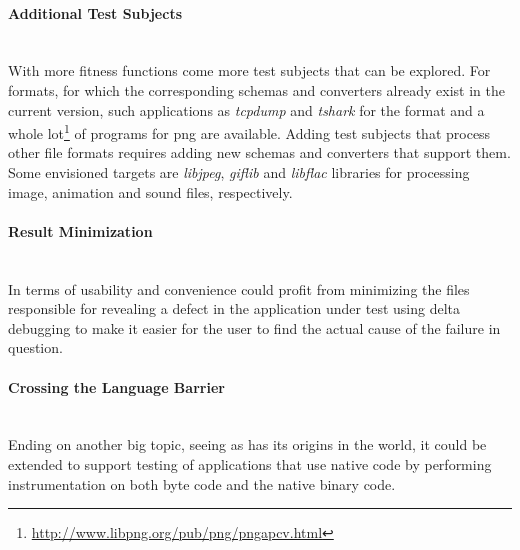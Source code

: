 \paragraph{Additional Test Subjects} ~\\
With more fitness functions come more test subjects that can be explored. For formats, for which the
corresponding schemas and converters already exist in the current version, such applications as \emph{tcpdump}
and \emph{tshark} for the \pcap format and a whole
lot\footnote{\url{http://www.libpng.org/pub/png/pngapcv.html}} of programs for {\small png} are available.
Adding test subjects that process other file formats requires adding new schemas and converters that
support them. Some envisioned targets are \emph{libjpeg}, \emph{giflib} and \emph{libflac} libraries for
processing image, animation and sound files, respectively.
\paragraph{Result Minimization} ~\\
In terms of usability and convenience \xmlmate could profit from minimizing the files responsible for
revealing a defect in the application under test using delta debugging\cite{zeller2002simplifying} to make it
easier for the user to find the actual cause of the failure in question.
\paragraph{Crossing the Language Barrier} ~\\
Ending on another big topic, seeing as \xmlmate has its origins in the \java world, it could be extended
to support testing of \java applications that use native code by performing instrumentation on both \java
byte code and the native binary code. 

{\color{white}{Thank you for reading the digital version and not printing this out on paper! :)}}